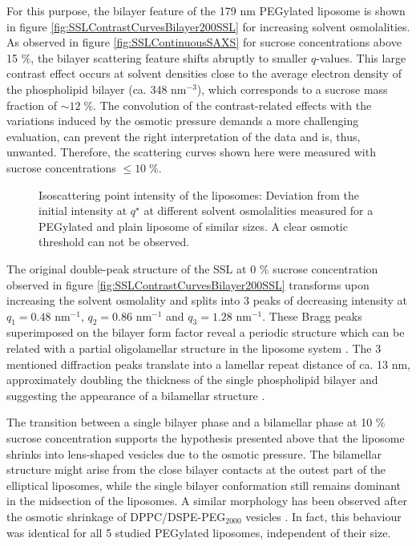 For this purpose, the bilayer feature of the 179 nm PEGylated liposome is shown in figure \ref{fig:SSLContrastCurvesBilayer200SSL} for increasing solvent osmolalities. As observed in figure \ref{fig:SSLContinuousSAXS} for sucrose concentrations above 15 $\%$, the bilayer scattering feature shifts abruptly to smaller $q$-values. This large contrast effect occurs at solvent densities close to the average electron density of the phospholipid bilayer (ca. 348 nm$^{-3}$), which corresponds to a sucrose mass fraction of $\sim 12 \; \%$. The convolution of the contrast-related effects with the variations induced by the osmotic pressure demands a more challenging evaluation, can prevent the right interpretation of the data and is, thus, unwanted. Therefore, the scattering curves shown here were measured with sucrose concentrations $\leq10\;\%$.

\begin{figure}
	\centering
		
		\caption[Isoscattering point intensity of two different liposomes.]{Isoscattering point intensity of the liposomes: Deviation from the initial intensity at $q^{\star}$ at different solvent osmolalities measured for a PEGylated and plain liposome of similar sizes. A clear osmotic threshold can not be observed.}
		\label{fig:SSLIsopointIntensity}
\end{figure}

The original double-peak structure of the SSL at 0 $\%$ sucrose concentration observed in figure \ref{fig:SSLContrastCurvesBilayer200SSL} transforms upon increasing the solvent osmolality and splits into 3 peaks of decreasing intensity at $q_1=0.48$ nm$^{-1}$, $q_2=0.86$ nm$^{-1}$ and $q_3=1.28$ nm$^{-1}$. These Bragg peaks superimposed on the bilayer form factor reveal a periodic structure which can be related with a partial oligolamellar structure in the liposome system \citep{fernandez_influence_2008}. The 3 mentioned diffraction peaks translate into a lamellar repeat distance of ca. 13 nm, approximately doubling the thickness of the single phospholipid bilayer \citep{kenworthy_range_1995} and suggesting the appearance of a bilamellar structure \citep{deme_giant_2002}. 

The transition between a single bilayer phase and a bilamellar phase at 10 $\%$ sucrose concentration supports the hypothesis presented above that the liposome shrinks into lens-shaped vesicles due to the osmotic pressure. The bilamellar structure might arise from the close bilayer contacts at the outest part of the elliptical liposomes, while the single bilayer conformation still remains dominant in the midsection of the liposomes. A similar morphology has been observed after the osmotic shrinkage of DPPC/DSPE-PEG$_{2000}$ vesicles \citep{terreno_osmotically_2009}. In fact, this behaviour was identical for all 5 studied PEGylated liposomes, independent of their size. 

